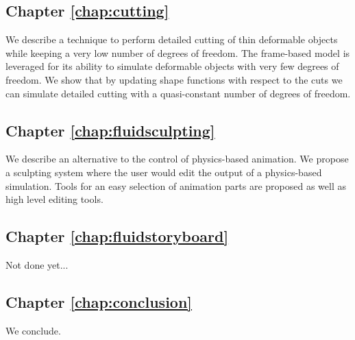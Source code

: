 \documentclass[11pt, oneside, a4paper]{memoir}
\begin{document}
\subsection*{Chapter \ref{chap:cutting}}
We describe a technique to perform detailed cutting of thin deformable objects while keeping a very low number of degrees of freedom. The frame-based model is leveraged for its ability to simulate deformable objects with very few degrees of freedom. We show that by updating shape functions with respect to the cuts we can simulate detailed cutting with a quasi-constant number of degrees of freedom. \\

\subsection*{Chapter \ref{chap:fluidsculpting}}
We describe an alternative to the control of physics-based animation. We propose a sculpting system where the user would edit the output of a physics-based simulation. Tools for an easy selection of animation parts are proposed as well as high level editing tools. \\

\subsection*{Chapter \ref{chap:fluidstoryboard}}
Not done yet...\\

\subsection*{Chapter \ref{chap:conclusion}}
We conclude.
\end{document}

